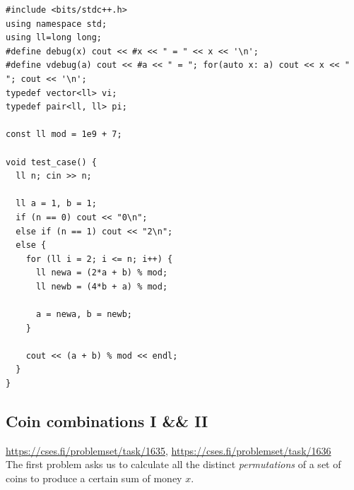 \begin{verbatim}
#include <bits/stdc++.h>
using namespace std;
using ll=long long;
#define debug(x) cout << #x << " = " << x << '\n';
#define vdebug(a) cout << #a << " = "; for(auto x: a) cout << x << " "; cout << '\n';
typedef vector<ll> vi;
typedef pair<ll, ll> pi;

const ll mod = 1e9 + 7;

void test_case() {
  ll n; cin >> n; 
  
  ll a = 1, b = 1;
  if (n == 0) cout << "0\n";
  else if (n == 1) cout << "2\n";
  else {
    for (ll i = 2; i <= n; i++) {
      ll newa = (2*a + b) % mod;
      ll newb = (4*b + a) % mod;
  
      a = newa, b = newb;
    }
  
    cout << (a + b) % mod << endl;
  }
}
\end{verbatim}

\subsection{Coin combinations I \&\& II}
\url{https://cses.fi/problemset/task/1635}, \url{https://cses.fi/problemset/task/1636} \\

The first problem asks us to calculate all the distinct \textit{permutations} of a set of coins to produce a certain sum of money $x$.
